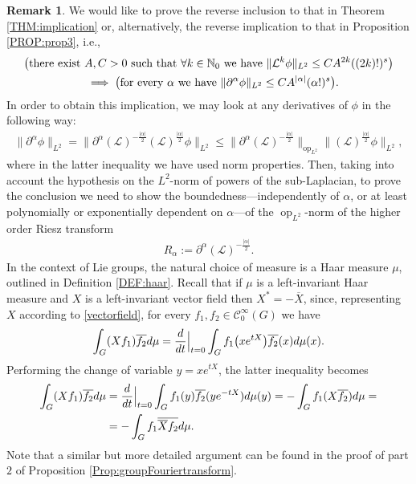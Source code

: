 \documentclass[12pt,oneside,a4paper]{book}
\numberwithin{equation}{section}     %
\theoremstyle{plain}
\theoremstyle{definition}
\newtheorem{remark}[theorem]{Remark}
\DeclareMathOperator{\OP}{op}
\newcommand{\N}{{\mathbb N}}
\newcommand{\slp}{{\mathcal L}}
\begin{document}
\begin{remark}\label{REM:oppImplication}
	We would like to prove the reverse inclusion to that in Theorem \ref{THM:implication} or, alternatively, the reverse implication to that in Proposition \ref{PROP:prop3}, i.e.,
	\begin{align}\notag
	\big(\text{there exist }&A,C>0\text{ such that }\forall k\in\N_0\text{ we have } \|\slp^{k}\phi\|_{L^2}\leq CA^{2k}((2k)!)^s \big)\\\notag
	& \implies\big(\text{for every }\alpha\text{ we have }\|\partial^\alpha\phi\|_{L^2}\leq C A^{|\alpha|}(\alpha!)^s\big).
	\end{align}
	In order to obtain this implication, we may look at any derivatives of $\phi$ in the following way:
	\begin{align}\label{EQ:insertingIdentity}
	\|\partial^\alpha\phi\|_{L^2}=\|\partial^\alpha(\slp)^{-\frac{|\alpha|}{2}}(\slp)^{\frac{|\alpha|}{2}}\phi\|_{L^2}\leq \|\partial^\alpha(\slp)^{-\frac{|\alpha|}{2}}\|_{\OP_{L^2}}\|(\slp)^{\frac{|\alpha|}{2}}\phi\|_{L^2},
	\end{align}
	where in the latter inequality we have used norm properties.
	Then, taking into account the hypothesis on the $L^2$-norm of powers of the sub-Laplacian, to prove the conclusion we need to show the boundedness---independently of $\alpha$, or at least polynomially or exponentially dependent on $\alpha$---of the $\OP_{L^2}$-norm of the higher order Riesz transform
	\begin{align}\label{EQ:RieszTransform}
	R_\alpha:=\partial^\alpha(\slp)^{-\frac{|\alpha|}{2}}.
	\end{align}
	In the context of Lie groups, the natural choice of measure is a Haar measure $\mu$, outlined in Definition \ref{DEF:haar}. Recall that if $\mu$ is a left-invariant Haar measure and $X$ is a left-invariant vector field then $X^*=-\overline{X}$, since, representing $X$ according to \eqref{vectorfield}, for every $f_1,f_2\in\mathcal{C}^\infty_0(G)$ we have
	\begin{align*}
	\int_G (Xf_1) \overline{f_2} d\mu=\frac{d}{dt}\Bigr{|}_{t=0}\int_Gf_1\big(xe^{tX}\big)\overline{f_2}(x)d\mu(x).
	\end{align*}
	Performing the change of variable $y=xe^{tX}$, the latter inequality becomes
	\begin{align*}
	\int_G (Xf_1) \overline{f_2} d\mu&=\frac{d}{dt}\Bigr{|}_{t=0}\int_Gf_1(y)\overline{f_2}(ye^{-tX})d\mu(y)=-\int_G f_1(X\overline{f_2})d\mu=\\
	&=-\int_G f_1\overline{\overline{X}f_2}d\mu.
	\end{align*}
	Note that a similar but more detailed argument can be found in the proof of part $2$ of Proposition \ref{Prop:groupFouriertransform}. 
	

\end{remark}
\end{document}
